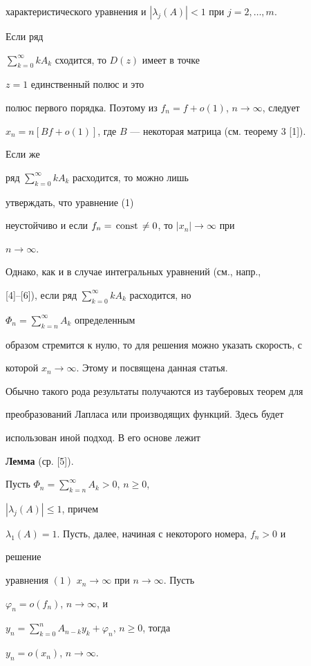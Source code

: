 характеристического уравнения и $|\lambda_j(A)|<1$ при $j=2,\dotsc,m$. 


Если ряд 


$\sum\limits^\infty_{k=0}k{}A_k$ сходится, то $D(z)$ имеет в точке 


$z=1$ единственный полюс и это 


полюс первого порядка. Поэтому из $f_n=f+o(1)$, $n\to\infty$, следует 


$x_n=n[B{}f+o(1)]$, где $B$ --- некоторая матрица (см. теорему 3 [1]). 


Если же 


ряд $\sum\limits^\infty_{k=0}k{}A_k$ расходится, то можно лишь 


утверждать, что уравнение (1) 


неустойчиво и если $f_n=\,\text{const\,}\ne0$, то $|x_n|\to\infty$ при 


$n\to\infty$. 


 


Однако, как и в случае интегральных уравнений (см., напр., 


[4]--[6]), если ряд $\sum\limits^\infty_{k=0}k{}A_k$ расходится, но 


$\Phi_n=\sum\limits^\infty_{k=n}A_k$ определенным 


образом стремится к нулю, то для решения можно указать скорость, с 


которой $x_n\to\infty$. Этому и посвящена данная статья. 


Обычно такого рода результаты получаются из тауберовых теорем для 


преобразований Лапласа или производящих функций. Здесь будет 


использован иной подход. В его основе лежит 


\medskip 


 


{\bf Лемма} (ср. [5]). {\it 


Пусть $\Phi_n=\sum\limits^\infty_{k=n}A_k>0$, $n\ge0$, 


$|\lambda_j(A)|\le1$, причем 


$\lambda_1(A)=1$. Пусть, далее, начиная с некоторого номера, $f_n>0$ и 


решение 


уравнения $(1)$ $x_n\to\infty$ при $n\to\infty$. Пусть 


$\varphi_n=o(f_n)$, $n\to\infty$, и 


$y_n=\sum\limits^n_{k=0}A_{n-k}y_k+\varphi_n$, $n\ge0$, тогда 


$y_n=o(x_n)$, $n\to\infty$. 


} 


